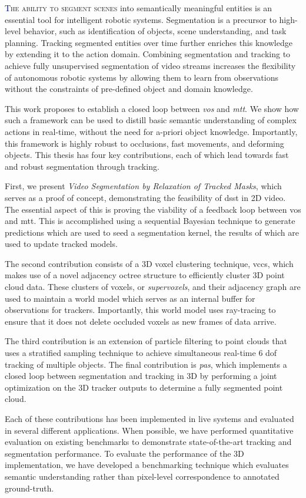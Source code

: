 \lettrine[lines=2, loversize=0.3]{\textcolor{DarkBlue}T}{he ability to segment scenes} into semantically meaningful entities is an essential tool for intelligent robotic systems. Segmentation is a precursor to high-level behavior, such as identification of objects, scene understanding, and task planning. Tracking segmented entities over time further enriches this knowledge by extending it to the action domain. Combining segmentation and tracking to achieve fully unsupervised segmentation of video streams increases the flexibility of autonomous robotic systems by allowing them to learn from observations without the constraints of pre-defined object and domain knowledge.

This work proposes to establish a closed loop between \emph{\gls{vos}} and \emph{\gls{mtt}}. We show how such a framework can be used to distill basic semantic understanding of complex actions in real-time, without the need for a-priori object knowledge. Importantly, this framework is highly robust to occlusions, fast movements, and deforming objects. This thesis has four key contributions, each of which lead towards fast and robust segmentation through tracking.

First, we present \emph{Video Segmentation by Relaxation of Tracked Masks}, which serves as a proof of concept, demonstrating the feasibility of \gls{dsst} in 2D video. The essential aspect of this is proving the viability of a  feedback loop between \gls{vos} and \gls{mtt}. This is accomplished using a sequential Bayesian technique to generate predictions which are used to seed a segmentation kernel, the results of which are used to update tracked models. 

The second contribution consists of a 3D voxel clustering technique, \gls{vccs}, which makes use of a novel adjacency octree structure to efficiently cluster 3D point cloud data. These clusters of voxels, or \emph{supervoxels}, and their adjacency graph are used to maintain a world model which serves as an internal buffer for observations for trackers. Importantly, this world model uses ray-tracing to ensure that it does not delete occluded voxels as new frames of data arrive.

The third contribution is an extension of particle filtering to point clouds that uses a stratified sampling technique to achieve simultaneous real-time 6 \gls{dof} tracking of multiple objects. The final contribution is \emph{\gls{pas}}, which implements a closed loop between segmentation and tracking in 3D by performing a joint optimization on the 3D tracker outputs to determine a fully segmented point cloud. 

Each of these contributions has been implemented in live systems and evaluated in several different applications. When possible, we have performed quantitative evaluation on existing benchmarks to demonstrate state-of-the-art tracking and segmentation performance. To evaluate the performance of the 3D implementation, we have developed a benchmarking technique which evaluates semantic understanding rather than pixel-level correspondence to annotated ground-truth.

